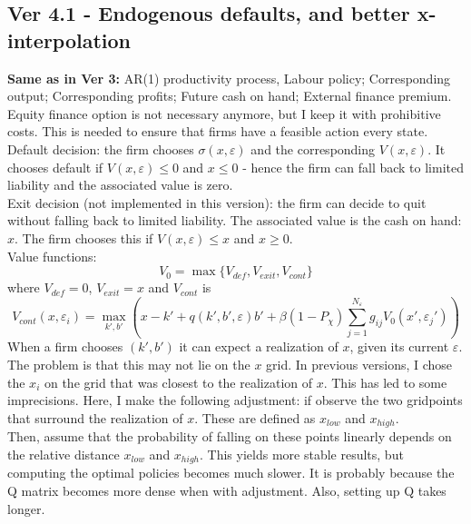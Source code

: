 \documentclass[12pt]{article}
\begin{document}
\newpage
\setcounter{equation}{0}

\subsection*{Ver 4.1 - Endogenous defaults, and better x-interpolation}
\textbf{Same as in Ver 3:} AR(1) productivity process, Labour policy; Corresponding output; Corresponding profits; Future cash on hand; External finance premium. \vspace{3mm} \\
Equity finance option is not necessary anymore, but I keep it with prohibitive costs. This is needed to ensure that firms have a feasible action every state.  \vspace{3mm} \\
Default decision: the firm chooses $\sigma(x, \varepsilon)$ and the corresponding $V(x, \varepsilon)$. It chooses default if $V(x,\varepsilon) \leq 0$ and $x \leq 0$ - hence the firm can fall back to limited liability and the associated value is zero. \vspace{3mm} \\
Exit decision (not implemented in this version): the firm can decide to quit without falling back to limited liability. The associated value is the cash on hand: $x$. The firm chooses this if $V(x, \varepsilon) \leq x$ and $x \geq 0$. \vspace{3mm} \\
Value functions:
\begin{equation}
    V_0 = \max \{ V_{def}, V_{exit}, V_{cont} \}
\end{equation}
where $ V_{def} = 0$, $V_{exit} = x$ and $V_{cont}$ is
\begin{equation}
     V_{cont}(x, \varepsilon_i) = \max_{k',b'}  \left( x - k' +  q(k',b',\varepsilon) b' +
            \beta (1-P_\chi) \sum_{j=1}^{N_\varepsilon} g_{ij}  V_0(x',\varepsilon_j') \right)
\end{equation}
When a firm chooses $(k',b')$ it can expect a realization of $x$, given its current $\varepsilon$. The problem is that this may not lie on the $x$ grid. In previous versions, I chose the $x_i$ on the grid that was closest to the realization of $x$. This has led to some imprecisions. Here, I make the following adjustment: if observe the two gridpoints that surround the realization of $x$. These are defined as $x_{low}$ and $x_{high}$. \vspace{3mm} \\
Then, assume that the probability of falling on these points linearly depends on the relative distance $x_{low}$ and $x_{high}$. This yields more stable results, but computing the optimal policies becomes much slower. It is probably because the Q matrix becomes more dense when with adjustment. Also, setting up Q takes longer.
\end{document}
